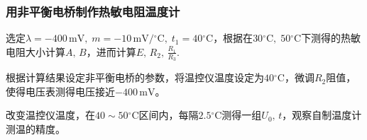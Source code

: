 \documentclass[UTF8]{article}
\theoremstyle{MyLineTheoremStyle} %
\theoremstyle{MyBlockTheoremStyle} %
\theoremstyle{MySubsubsectionStyle} %
\begin{document}
\subsubsection{用非平衡电桥制作热敏电阻温度计}
选定$ \lambda = -400\,\mathrm{mV},\; m=-10\,\mathrm{mV/\mathrm{^\circ C}},\; t_1=40\mathrm{^\circ C} $，根据在$ 30\mathrm{^\circ C},\;50\mathrm{^\circ C} $下测得的热敏电阻大小计算$ A,\,B $，进而计算$ E,\,R_2,\,\frac{R_1}{R_3} $.

根据计算结果设定非平衡电桥的参数，将温控仪温度设定为$ 40\mathrm{^\circ C} $，微调$ R_2 $阻值，使得电压表测得电压接近$ -400\,\mathrm{mV} $。

改变温控仪温度，在$ 40\sim 50\mathrm{^\circ C} $区间内，每隔$ 2.5\mathrm{^\circ C} $测得一组$ U_0,\,t $，观察自制温度计测温的精度。

















\thispagestyle{fancy} 

\begin{figure}[H]\centering
\end{figure}

\thispagestyle{fancy} 
%
\end{document}
